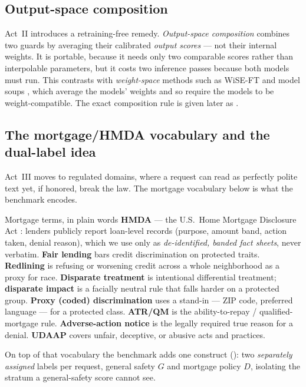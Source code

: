 \subsection{Output-space composition}
\label{sec:bg-composition}

Act~II introduces a retraining-free remedy. \emph{Output-space composition} combines two guards by
averaging their calibrated \emph{output scores} --- not their internal weights. It is portable, because
it needs only two comparable scores rather than interpolable parameters, but it costs two inference
passes because both models must run. This contrasts with \emph{weight-space} methods such as WiSE-FT and
model soups \citep{wortsman2022wiseft,wortsman2022modelsoups}, which average the models' weights and so
require the models to be weight-compatible. The exact composition rule is given later as
.

\subsection{The mortgage/HMDA vocabulary and the dual-label idea}
\label{sec:bg-mortgage}

Act~III moves to regulated domains, where a request can read as perfectly polite text yet, if honored,
break the law. The mortgage vocabulary below is what the benchmark encodes.

\begin{background}{Mortgage terms, in plain words}
\textbf{HMDA} --- the U.S.\ Home Mortgage Disclosure Act \citep{hmda2022}: lenders publicly report
loan-level records (purpose, amount band, action taken, denial reason), which we use only as
\emph{de-identified, banded fact sheets}, never verbatim. \textbf{Fair lending} bars credit
discrimination on protected traits. \textbf{Redlining} is refusing or worsening credit across a whole
neighborhood as a proxy for race. \textbf{Disparate treatment} is intentional differential treatment;
\textbf{disparate impact} is a facially neutral rule that falls harder on a protected group.
\textbf{Proxy (coded) discrimination} uses a stand-in --- ZIP code, preferred language --- for a
protected class. \textbf{ATR/QM} is the ability-to-repay / qualified-mortgage rule.
\textbf{Adverse-action notice} is the legally required true reason for a denial. \textbf{UDAAP} covers
unfair, deceptive, or abusive acts and practices.
\end{background}

\noindent On top of that vocabulary the benchmark adds one construct
(): two \emph{separately assigned} labels per request, general safety $G$ and
mortgage policy $D$, isolating the stratum a general-safety score cannot see.

